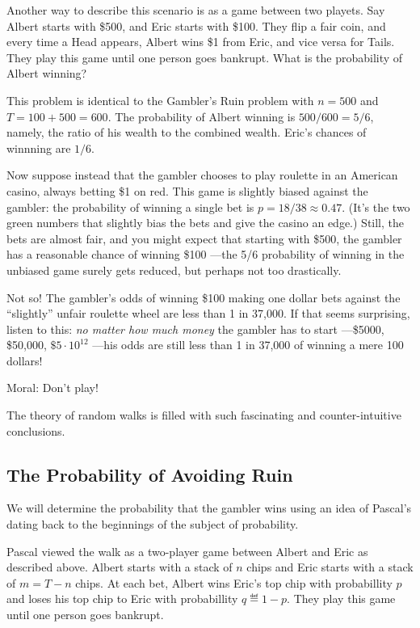 Another way to describe this scenario is as a game between two
playets.  Say Albert starts with \$500, and Eric starts with \$100.  They
flip a fair coin, and every time a Head appears, Albert wins \$1 from
Eric, and vice versa for Tails.  They play this game until one person
goes bankrupt.  What is the probability of Albert winning?

This problem is identical to the Gambler's Ruin problem with $n=500$
and $T=100+500=600$.  The probability of Albert winning is $500/600 =
5/6$, namely, the ratio of his wealth to the combined wealth.  Eric's
chances of winnning are $1/6$.



Now suppose instead that the gambler chooses to play roulette in an
American casino, always betting \$1 on red.  This game is slightly
biased against the gambler: the probability of winning a single bet is
$p = 18/38 \approx 0.47$.  (It's the two green numbers that slightly
bias the bets and give the casino an edge.)  Still, the bets are
almost fair, and you might expect that starting with \$500, the
gambler has a reasonable chance of winning \$100 ---the 5/6
probability of winning in the unbiased game surely gets reduced, but
perhaps not too drastically.

Not so!  The gambler's odds of winning \$100 making one dollar bets
against the ``slightly'' unfair roulette wheel are less than 1 in 37,000.
If that seems surprising, listen to this: \emph{no matter how much money}
the gambler has to start ---\$5000, \$50,000, $\$5 \cdot 10^{12}$ ---his
odds are still less than 1 in 37,000 of winning a mere 100 dollars!

Moral:  Don't play!

The theory of random walks is filled with such fascinating and
counter-intuitive conclusions.

\subsection{The Probability of Avoiding Ruin}\label{prwinwalk_subsec}

We will determine the probability that the gambler wins using an idea
of Pascal's dating back to the beginnings of the subject of
probability.

Pascal viewed the walk as a two-player game between Albert and Eric as
described above.  Albert starts with a stack of $n$ chips and Eric
starts with a stack of $m = T-n$ chips.  At each bet, Albert wins
Eric's top chip with probabillity $p$ and loses his top chip to Eric
with probabillity $q \eqdef 1-p$.  They play this game until one
person goes bankrupt.

